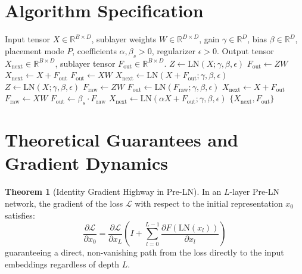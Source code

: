 \documentclass[11pt,a4paper]{article}
\theoremstyle{definition}
\newtheorem{theorem}{Theorem}[section]
\begin{document}
\section{Algorithm Specification}

\begin{algorithm}[H]
\caption{Transformer Block Forward with Normalization Placement}
\label{alg:norm_placement}
\begin{algorithmic}[1]
\Require Input tensor $X \in \mathbb{R}^{B \times D}$, sublayer weights $W \in \mathbb{R}^{D \times D}$, gain $\gamma \in \mathbb{R}^D$, bias $\beta \in \mathbb{R}^D$, placement mode $P$, coefficients $\alpha, \beta_s > 0$, regularizer $\epsilon > 0$.
\Ensure Output tensor $X_{\text{next}} \in \mathbb{R}^{B \times D}$, sublayer tensor $F_{\text{out}} \in \mathbb{R}^{B \times D}$.
    \State $Z \gets \text{LN}(X; \gamma, \beta, \epsilon)$
    \State $F_{\text{out}} \gets Z W$
    \State $X_{\text{next}} \gets X + F_{\text{out}}$
    \State $F_{\text{out}} \gets X W$
    \State $X_{\text{next}} \gets \text{LN}(X + F_{\text{out}}; \gamma, \beta, \epsilon)$
    \State $Z \gets \text{LN}(X; \gamma, \beta, \epsilon)$
    \State $F_{\text{raw}} \gets Z W$
    \State $F_{\text{out}} \gets \text{LN}(F_{\text{raw}}; \gamma, \beta, \epsilon)$
    \State $X_{\text{next}} \gets X + F_{\text{out}}$
    \State $F_{\text{raw}} \gets X W$
    \State $F_{\text{out}} \gets \beta_s \cdot F_{\text{raw}}$
    \State $X_{\text{next}} \gets \text{LN}(\alpha X + F_{\text{out}}; \gamma, \beta, \epsilon)$
\EndIf
\State \Return $\{X_{\text{next}}, F_{\text{out}}\}$
\end{algorithmic}
\end{algorithm}

\section{Theoretical Guarantees and Gradient Dynamics}

\begin{theorem}[Identity Gradient Highway in Pre-LN]
In an $L$-layer Pre-LN network, the gradient of the loss $\mathcal{L}$ with respect to the initial representation $x_0$ satisfies:
\begin{equation}
\frac{\partial \mathcal{L}}{\partial x_0} = \frac{\partial \mathcal{L}}{\partial x_L} \left( I + \sum_{l=0}^{L-1} \frac{\partial F(\text{LN}(x_l))}{\partial x_l} \right)
\end{equation}
guaranteeing a direct, non-vanishing path from the loss directly to the input embeddings regardless of depth $L$.
\end{theorem}
\end{document}
